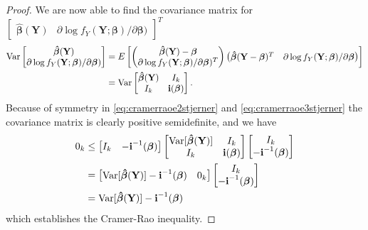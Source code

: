 \begin{proof}
We are now able to find the covariance matrix for $\begin{bmatrix} \boldsymbol{\hat{\beta}}(\textbf{Y}) & \partial \log f_Y(\textbf{Y};\boldsymbol{\beta})/\partial \boldsymbol{\beta}) \end{bmatrix}^T$
\begin{align*}
    \operatorname{\text{Var}} \begin{bmatrix}  \boldsymbol{\hat{\beta}}(\textbf{Y}) \\  \partial \log f_Y(\textbf{Y};\boldsymbol{\beta})/\partial \boldsymbol{\beta}) \end{bmatrix} &= E \begin{bmatrix} \begin{pmatrix} \boldsymbol{\hat{\beta}}(\textbf{Y})-\boldsymbol{\beta} \\  \partial \log f_Y(\textbf{Y};\boldsymbol{\beta})/\partial \boldsymbol{\beta})^T\end{pmatrix} \begin{pmatrix} \boldsymbol{\hat{\beta}}(\textbf{Y}-\boldsymbol{\beta})^T &  \partial \log f_Y(\textbf{Y};\boldsymbol{\beta})/\partial \boldsymbol{\beta} \end{pmatrix}\end{bmatrix}  \\
    &= \operatorname{\text{Var}} \begin{bmatrix} \boldsymbol{\hat{\beta}}(\textbf{Y}) & I_{k}\\
    I_{k} & \textbf{i}(\boldsymbol{\beta})\end{bmatrix}.
\end{align*}
Because of symmetry in \eqref{eq:cramerraoe2stjerner} and \eqref{eq:cramerraoe3stjerner} the covariance matrix is clearly positive semidefinite, and we have
\begin{align*}
    0_{k} & \leq \begin{bmatrix} I_{k} & -\textbf{i}^{-1}(\boldsymbol{\beta})\end{bmatrix} \begin{bmatrix} \operatorname{\text{Var}}[\boldsymbol{\hat{\beta}}(\textbf{Y})] & I_{k} \\ I_{k} & \textbf{i}(\boldsymbol{\beta}) \end{bmatrix}\begin{bmatrix} I_{k} \\ -\textbf{i}^{-1}(\boldsymbol{\beta})\end{bmatrix} \\
    &= \begin{bmatrix} \operatorname{\text{Var}}[\boldsymbol{\hat{\beta}}(\textbf{Y})] -\textbf{i}^{-1}(\boldsymbol{\beta}) & 0_{k}\end{bmatrix} \begin{bmatrix} I_{k} \\ -\textbf{i}^{-1}(\boldsymbol{\beta})\end{bmatrix} \\
    &= \operatorname{\text{Var}}[\boldsymbol{\hat{\beta}}(\textbf{Y})] -\textbf{i}^{-1}(\boldsymbol{\beta})
\end{align*}
which establishes the Cramer-Rao inequality.
\end{proof}

